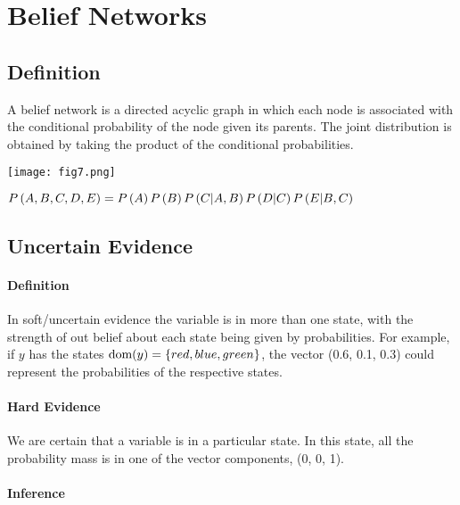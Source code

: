 \section{Belief Networks}
\label{section12.2}

\subsection{Definition}

A belief network is a directed acyclic graph in which each node is associated with the conditional probability of the node given its parents. The joint distribution is obtained by taking the product of the conditional probabilities.

\begin{minipage}{0.4\textwidth}
	\centering
	\texttt{[image: fig7.png]}
\end{minipage}
\begin{minipage}{0.6\textwidth}
	$\P{A,B,C,D,E}=\\ \P{A}\P{B}\P{C|A,B}\P{D|C}\P{E|B,C}$
\end{minipage}

\subsection{Uncertain Evidence}

\paragraph{Definition}

In soft/uncertain evidence the variable is in more than one state, with the strength of out belief about each state being given by probabilities. For example, if $y$ has the states $\dom(y)=\{red,blue,green\}$, the vector (0.6, 0.1, 0.3) could represent the probabilities of the respective states.

\paragraph{Hard Evidence}

We are certain that a variable is in a particular state. In this state, all the probability mass is in one of the vector components, (0, 0, 1).

\paragraph{Inference}

